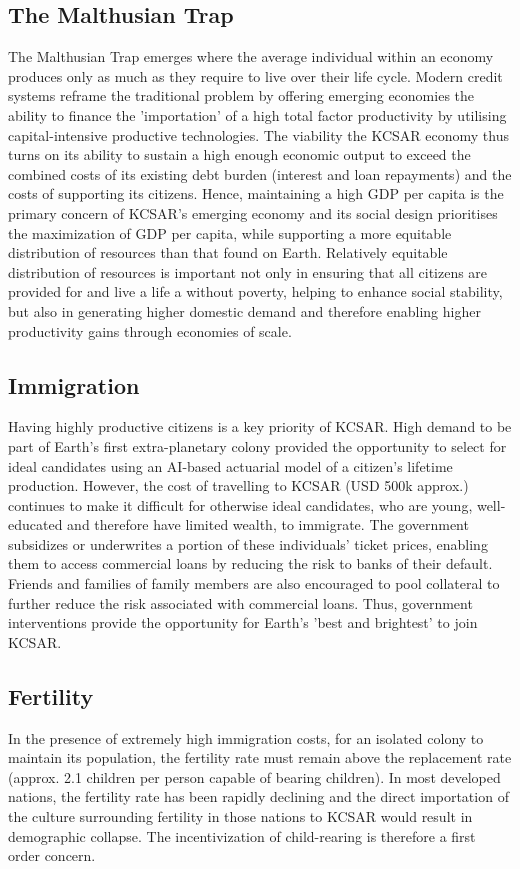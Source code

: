 \documentclass[fleqn,10pt]{Stylesheet} %
\begin{document}
\subsection{The Malthusian Trap}
The Malthusian Trap emerges where the average individual within an economy produces only as much as they require to live over their life cycle. Modern credit systems reframe the traditional problem by offering emerging economies the ability to finance the 'importation' of a high total factor productivity by utilising capital-intensive productive technologies. The viability the KCSAR economy thus turns on its ability to sustain a high enough economic output to exceed the combined costs of its existing debt burden (interest and loan repayments) and the costs of supporting its citizens. Hence, maintaining a high GDP per capita is the primary concern of KCSAR's emerging economy and its social design prioritises the maximization of GDP per capita, while supporting a more equitable distribution of resources than that found on Earth. Relatively equitable distribution of resources is important not only in ensuring that all citizens are provided for and live a life a without poverty, helping to enhance social stability, but also in generating higher domestic demand and therefore enabling higher productivity gains through economies of scale. \cite{Kogel&Prskawetz, 2000} 

\subsection{Immigration}
Having highly productive citizens is a key priority of KCSAR. High demand to be part of Earth's first extra-planetary colony provided the opportunity to select for ideal candidates using an AI-based actuarial model of a citizen's lifetime production. However, the cost of travelling to KCSAR (USD 500k approx.) continues to make it difficult for otherwise ideal candidates, who are young, well-educated and therefore have limited wealth, to immigrate. The government subsidizes or underwrites a portion of these individuals' ticket prices, enabling them to access commercial loans by reducing the risk to banks of their default. Friends and families of family members are also encouraged to pool collateral to further reduce the risk associated with commercial loans. Thus, government interventions provide the opportunity for Earth's 'best and brightest' to join KCSAR.

\subsection{Fertility}
In the presence of extremely high immigration costs, for an isolated colony to maintain its population, the fertility rate must remain above the replacement rate (approx. 2.1 children per person capable of bearing children). In most developed nations, the fertility rate has been rapidly declining and the direct importation of the culture surrounding fertility in those nations to KCSAR would result in demographic collapse. The incentivization of child-rearing is therefore a first order concern.
\end{document}
